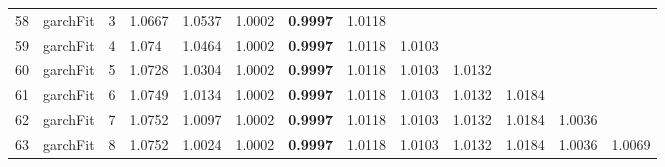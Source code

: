 \documentclass[10pt,a4paper]{article}
\begin{document}
\begin{table}[ht]
\begin{tabular}{rlrllllllllll}
  58 & garchFit &     3 & 1.0667 & 1.0537 & 1.0002 & \textbf{0.9997} & 1.0118 &  &  &  &  &  \\ 
  59 & garchFit &     4 & 1.074 & 1.0464 & 1.0002 & \textbf{0.9997} & 1.0118 & 1.0103 &  &  &  &  \\ 
  60 & garchFit &     5 & 1.0728 & 1.0304 & 1.0002 & \textbf{0.9997} & 1.0118 & 1.0103 & 1.0132 &  &  &  \\ 
  61 & garchFit &     6 & 1.0749 & 1.0134 & 1.0002 & \textbf{0.9997} & 1.0118 & 1.0103 & 1.0132 & 1.0184 &  &  \\ 
  62 & garchFit &     7 & 1.0752 & 1.0097 & 1.0002 & \textbf{0.9997} & 1.0118 & 1.0103 & 1.0132 & 1.0184 & 1.0036 &  \\ 
  63 & garchFit &     8 & 1.0752 & 1.0024 & 1.0002 & \textbf{0.9997} & 1.0118 & 1.0103 & 1.0132 & 1.0184 & 1.0036 & 1.0069 \\ 
   \hline
\end{tabular}
\end{table}
\end{document}

